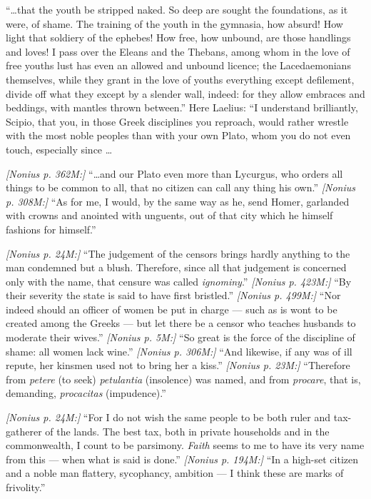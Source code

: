  ``\ldots that the youth be stripped naked. So deep are sought the foundations, as it were, of shame. The training of the youth in the gymnasia, how absurd! How light that soldiery of the ephebes! How free, how unbound, are those handlings and loves! I pass over the Eleans and the Thebans, among whom in the love of free youths lust has even an allowed and unbound licence; the Lacedaemonians themselves, while they grant in the love of youths everything except defilement, divide off what they except by a slender wall, indeed: for they allow embraces and beddings, with mantles thrown between.'' Here Laelius: ``I understand brilliantly, Scipio, that you, in those Greek disciplines you reproach, would rather wrestle with the most noble peoples than with your own Plato, whom you do not even touch, especially since \ldots

 \textit{[Nonius p. 362M:]} ``\ldots and our Plato even more than Lycurgus, who orders all things to be common to all, that no citizen can call any thing his own.'' \textit{[Nonius p. 308M:]} ``As for me, I would, by the same way as he, send Homer, garlanded with crowns and anointed with unguents, out of that city which he himself fashions for himself.''

 \textit{[Nonius p. 24M:]} ``The judgement of the censors brings hardly anything to the man condemned but a blush. Therefore, since all that judgement is concerned only with the name, that censure was called \textit{ignominy}.'' \textit{[Nonius p. 423M:]} ``By their severity the state is said to have first bristled.'' \textit{[Nonius p. 499M:]} ``Nor indeed should an officer of women be put in charge --- such as is wont to be created among the Greeks --- but let there be a censor who teaches husbands to moderate their wives.'' \textit{[Nonius p. 5M:]} ``So great is the force of the discipline of shame: all women lack wine.'' \textit{[Nonius p. 306M:]} ``And likewise, if any was of ill repute, her kinsmen used not to bring her a kiss.'' \textit{[Nonius p. 23M:]} ``Therefore from \textit{petere} (to seek) \textit{petulantia} (insolence) was named, and from \textit{procare}, that is, demanding, \textit{procacitas} (impudence).''

 \textit{[Nonius p. 24M:]} ``For I do not wish the same people to be both ruler and tax-gatherer of the lands. The best tax, both in private households and in the commonwealth, I count to be parsimony. \textit{Faith} seems to me to have its very name from this --- when what is said is done.'' \textit{[Nonius p. 194M:]} ``In a high-set citizen and a noble man flattery, sycophancy, ambition --- I think these are marks of frivolity.''

